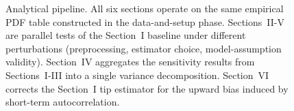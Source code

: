 \documentclass[12pt,a4paper]{article}
\begin{document}
\begin{figure}[htbp]
{%
}%
\caption{Analytical pipeline. All six sections operate on the same empirical
PDF table constructed in the data-and-setup phase. Sections~II-V are parallel
tests of the Section~I baseline under different perturbations (preprocessing,
estimator choice, model-assumption validity). Section~IV aggregates the
sensitivity results from Sections~I-III into a single variance decomposition.
Section~VI corrects the Section~I tip estimator for the upward bias induced by
short-term autocorrelation.}
\label{fig:pipeline}
\end{figure}
\end{document}
